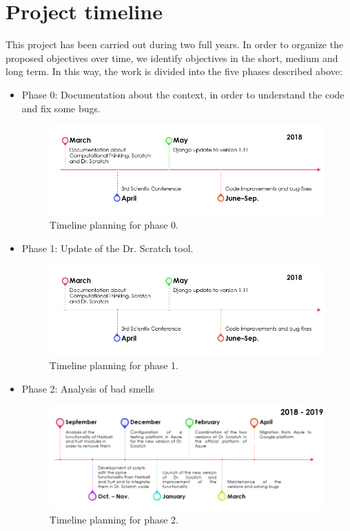 \section{Project timeline}
\label{sec:timeline-project}

This project has been carried out during two full years. In order to organize the proposed objectives over time, we identify objectives in the short, medium and long term. In this way, the work is divided into the five phases described above:

\begin{itemize}
    \item Phase 0: Documentation about the context, in order to understand the code and fix some bugs.
    
    \begin{figure}[ht]
    \centering
        \includegraphics[width=12cm, keepaspectratio]{img/phase_0.png}
        \caption{Timeline planning for phase 0.}
        \label{fig:phase_0}
    \end{figure}

    \item Phase 1: Update of the Dr. Scratch tool.
    
    \begin{figure}[ht]
    \centering
        \includegraphics[width=12cm, keepaspectratio]{img/phase_1.png}
        \caption{Timeline planning for phase 1.}
        \label{fig:phase_1}
    \end{figure}
    
    \item Phase 2: Analysis of bad smells
    
    \begin{figure}[ht]
    \centering
        \includegraphics[width=12cm, keepaspectratio]{img/phase_2.png}
        \caption{Timeline planning for phase 2.}
        \label{fig:phase_2}
    \end{figure}
    

\end{itemize}
